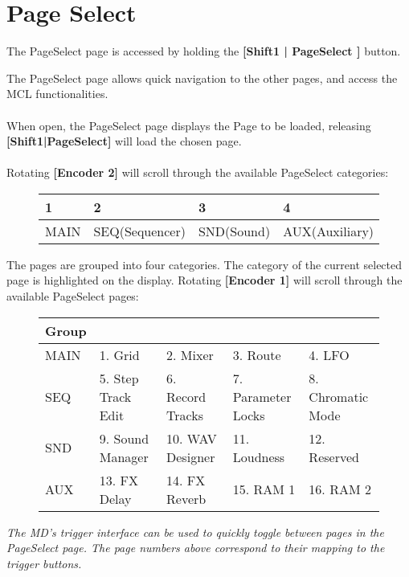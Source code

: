 \chapter{Page Select}
The PageSelect page is accessed by holding the \textbf{[Shift1 | PageSelect ]} button.

The PageSelect page allows quick navigation to the other pages, and access the MCL functionalities.
\\
\\
When open, the PageSelect page displays the Page to be loaded, releasing \textbf{[Shift1|PageSelect]} will load
the chosen page.
\\
\\
Rotating \textbf{[Encoder 2]} will scroll through the available PageSelect categories:

\begin{figure}[h]
    \begin{tabular}{|l|l|l|l|}
    \hline
    \rowcolor[HTML]{C0C0C0} 
    1    & 2              & 3          & 4              \\ \hline
    MAIN & SEQ(Sequencer) & SND(Sound) & AUX(Auxiliary) \\ \hline
    \end{tabular}
\end{figure}

The pages are grouped into four categories. The category of the current selected page is highlighted on the display.
Rotating \textbf{[Encoder 1]} will scroll through the available PageSelect pages:

\begin{figure}[h]
    \begin{tabular}{|l|l|l|l|l|}
    \hline
    \rowcolor[HTML]{C0C0C0} 
    {\color[HTML]{000000} Group} & \multicolumn{4}{l|}{\cellcolor[HTML]{C0C0C0}{\color[HTML]{000000} Pages}}      \\ \hline
    MAIN                              & 1. Grid            & 2. Mixer         & 3. Route           & 4. LFO            \\ \hline
    SEQ                               & 5. Step Track Edit & 6. Record Tracks & 7. Parameter Locks & 8. Chromatic Mode \\ \hline
    SND                               & 9. Sound Manager   & 10. WAV Designer & 11. Loudness       & 12. Reserved      \\ \hline
    AUX                               & 13. FX Delay       & 14. FX Reverb    & 15. RAM 1          & 16. RAM 2         \\ \hline
    \end{tabular}
\end{figure}

\textit{The MD's trigger interface can be used to quickly toggle between pages in the PageSelect page. The page numbers above correspond to their mapping to the trigger buttons. }






